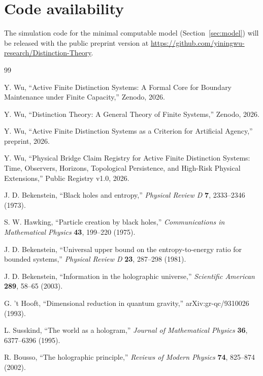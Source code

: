 \documentclass[10pt,a4paper,twocolumn,aps,prl]{revtex4-2}
\begin{document}
\section*{Code availability}

The simulation code for the minimal computable model (Section~\ref{sec:model}) will be released with the public preprint version at \url{https://github.com/yiningwu-research/Distinction-Theory}.

\clearpage
\begin{thebibliography}{99}

Y. Wu, ``Active Finite Distinction Systems: A Formal Core for Boundary Maintenance under Finite Capacity,'' Zenodo, 2026.

Y. Wu, ``Distinction Theory: A General Theory of Finite Systems,'' Zenodo, 2026.

Y. Wu, ``Active Finite Distinction Systems as a Criterion for Artificial Agency,'' preprint, 2026.

Y. Wu, ``Physical Bridge Claim Registry for Active Finite Distinction Systems: Time, Observers, Horizons, Topological Persistence, and High-Risk Physical Extensions,'' Public Registry v1.0, 2026.

J. D. Bekenstein, ``Black holes and entropy,'' \emph{Physical Review D} \textbf{7}, 2333--2346 (1973).

S. W. Hawking, ``Particle creation by black holes,'' \emph{Communications in Mathematical Physics} \textbf{43}, 199--220 (1975).

J. D. Bekenstein, ``Universal upper bound on the entropy-to-energy ratio for bounded systems,'' \emph{Physical Review D} \textbf{23}, 287--298 (1981).

J. D. Bekenstein, ``Information in the holographic universe,'' \emph{Scientific American} \textbf{289}, 58--65 (2003).

G. 't Hooft, ``Dimensional reduction in quantum gravity,'' arXiv:gr-qc/9310026 (1993).

L. Susskind, ``The world as a hologram,'' \emph{Journal of Mathematical Physics} \textbf{36}, 6377--6396 (1995).

R. Bousso, ``The holographic principle,'' \emph{Reviews of Modern Physics} \textbf{74}, 825--874 (2002).


\end{thebibliography}
\end{document}
